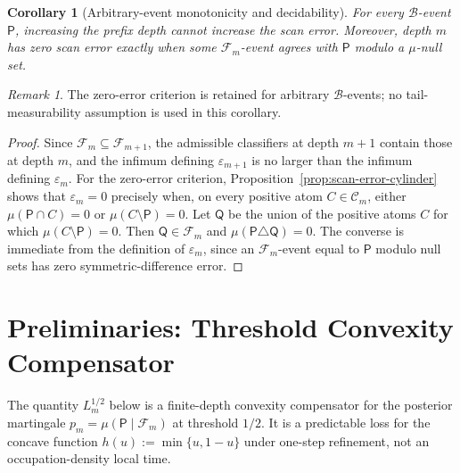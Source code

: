 \documentclass{etds}%
\numberwithin{equation}{section}
\theoremstyle{plain}
\newtheorem{corollary}[theorem]{Corollary}
\theoremstyle{definition}
\theoremstyle{remark}
\newtheorem{remark}[theorem]{Remark}
\begin{document}
\begin{corollary}[Arbitrary-event monotonicity and decidability]
\label{cor:basic-properties}
For every $\mathcal{B}$-event $\mathsf{P}$, increasing the prefix depth cannot
increase the scan error.  Moreover, depth $m$ has zero scan error exactly when
some $\mathcal{F}_m$-event agrees with $\mathsf{P}$ modulo a $\mu$-null set.
\end{corollary}

\begin{remark}
The zero-error criterion is retained for arbitrary $\mathcal{B}$-events; no
tail-measurability assumption is used in this corollary.
\end{remark}

\begin{proof}
Since $\mathcal{F}_m\subseteq\mathcal{F}_{m+1}$, the admissible classifiers at
depth $m+1$ contain those at depth $m$, and the infimum defining
$\varepsilon_{m+1}$ is no larger than the infimum defining $\varepsilon_m$.
For the zero-error criterion, Proposition~\ref{prop:scan-error-cylinder}
shows that $\varepsilon_m=0$ precisely when, on every positive atom
$C\in\mathcal{C}_m$, either $\mu(\mathsf{P}\cap C)=0$ or
$\mu(C\setminus\mathsf{P})=0$.  Let $\mathsf{Q}$ be the union of the positive
atoms $C$ for which $\mu(C\setminus\mathsf{P})=0$.  Then
$\mathsf{Q}\in\mathcal{F}_m$ and $\mu(\mathsf{P}\triangle\mathsf{Q})=0$.
The converse is immediate from the definition of $\varepsilon_m$, since an
$\mathcal{F}_m$-event equal to $\mathsf{P}$ modulo null sets has zero
symmetric-difference error.
\end{proof}

\section{Preliminaries: Threshold Convexity Compensator}
\label{sec:tanaka}

The quantity $L_m^{1/2}$ below is a finite-depth convexity compensator for the
posterior martingale $p_m=\mu(\mathsf{P}\mid\mathcal{F}_m)$ at threshold
$1/2$.  It is a predictable loss for the concave function
$h(u):=\min\{u,1-u\}$ under one-step refinement, not an occupation-density
local time.
\end{document}

